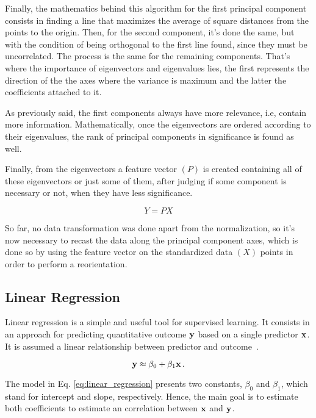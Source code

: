 Finally, the mathematics behind this algorithm for the first principal component consists in finding a line that maximizes the average of square distances from the points to the origin. Then, for the second component, it's done the same, but with the condition of being orthogonal to the first line found, since they must be uncorrelated. The process is the same for the remaining components. That's where the importance of eigenvectors and eigenvalues lies, the first represents the direction of the the axes where the variance is maximum and the latter the coefficients attached to it. 

As previously said, the first components always have more relevance, i.e, contain more information. Mathematically, once the eigenvectors are ordered according to their eigenvalues, the rank of principal components in significance is found as well.

Finally, from the eigenvectors a feature vector $(P)$ is created containing all of these eigenvectors or just some of them, after judging if some component is necessary or not, when they have less significance. 

\begin{equation}
    Y = P X
\end{equation}

So far, no data transformation was done apart from the normalization, so it's now necessary to recast the data along the principal component axes, which is done so by using the feature vector on the standardized data $(X)$ points in order to perform a reorientation.

\subsection{Linear Regression}
Linear regression is a simple and useful tool for supervised learning. It consists in an approach for predicting  quantitative outcome ${\bf y}$ based on a single predictor ${\bf x}$. It is assumed a linear relationship between predictor and outcome~\cite{James2013}.

\begin{equation}
{\bf y} \approx \beta_0 + \beta_1 {\bf x} \, . \label{eq:linear_regression}
\end{equation}

The model in Eq. \ref{eq:linear_regression} presents two constants, $\beta_0$ and $\beta_1$, which stand for intercept and slope, respectively. Hence, the main goal is to estimate both coefficients to estimate an correlation between ${\bf x}$ and ${\bf y}$.

